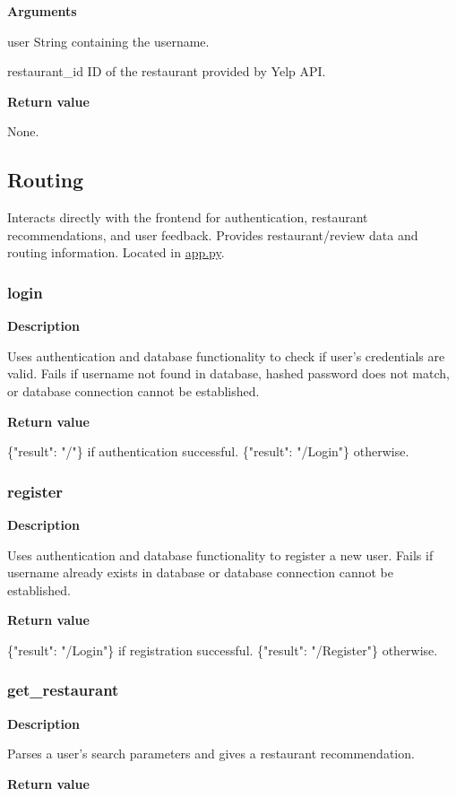 \documentclass[11pt]{article}
\begin{document}
\textbf{Arguments}
\begin{deflist}
	\item[user]String containing the username.
	\item[restaurant\_id]ID of the restaurant provided by Yelp API.
\end{deflist}

\textbf{Return value}

None.

\subsection{Routing}
Interacts directly with the frontend for authentication, restaurant recommendations, and user feedback. Provides restaurant/review data and routing information. Located in \url{app.py}.

\subsubsection{login}
\textbf{Description}

Uses authentication and database functionality to check if user's credentials are valid. Fails if username not found in database, hashed password does not match, or database connection cannot be established.

\textbf{Return value}

\{"result": "/"\} if authentication successful. \{"result": "/Login"\} otherwise.

\subsubsection{register}
\textbf{Description}

Uses authentication and database functionality to register a new user. Fails if username already exists in database or database connection cannot be established.

\textbf{Return value}

\{"result": "/Login"\} if registration successful. \{"result": "/Register"\} otherwise.

\subsubsection{get\_restaurant}
\textbf{Description}

Parses a user's search parameters and gives a restaurant recommendation. 

\textbf{Return value}
\end{document}
